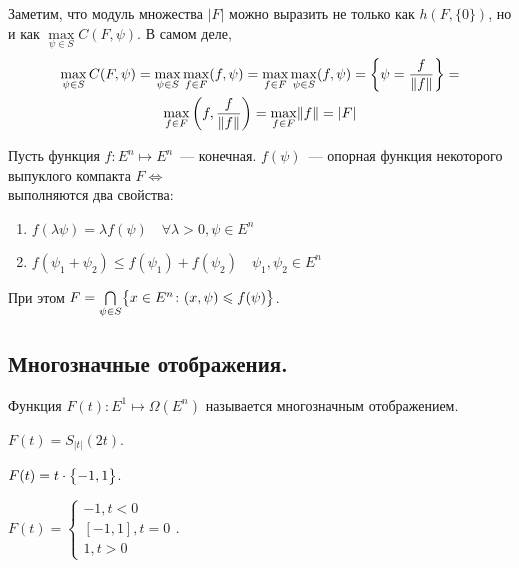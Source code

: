 Заметим, что модуль множества $|F|$ можно выразить не только как $h(F, \{0\})$, но и как $\max\limits_{\psi \in S} C(F, \psi)$.
В самом деле, 
\begin{multline*}
    \max\limits_{\psi \in S} C(F, \psi) = 
    \max\limits_{\psi \in S} \max\limits_{f \in F} (f, \psi) = 
    \max\limits_{f \in F} \max\limits_{\psi \in S} (f, \psi) = 
    \biggl\{ \psi = \frac{f}{\lVert f \rVert} \biggr\} = \\
    \max\limits_{f \in F} \left(f, \frac{f}{\lVert f \rVert}\right) =
    \max\limits_{f \in F} \lVert f \rVert = |F|
\end{multline*}

\begin{thm*}
    Пусть функция $f\colon E^n \mapsto E^n$~--- конечная.
    $f(\psi)$~--- опорная функция некоторого выпуклого компакта $F \iff$ \\
    выполняются два свойства:
    \begin{enumerate}
        \item $f(\lambda \psi) = \lambda f(\psi) \quad \forall \lambda > 0, \psi \in E^n$
        \item $f(\psi_1 + \psi_2) \leqslant f(\psi_1) + f(\psi_2) \quad \psi_1, \psi_2 \in E^n$
    \end{enumerate}

    При этом $F = \bigcap\limits_{\psi \in S} \bigl\{ x \in E^n\colon (x, \psi) \leqslant f(\psi) \bigr\}$.
\end{thm*}

\subsection*{Многозначные отображения.}

\begin{defn}
    Функция $F(t)\colon E^1 \mapsto \Omega(E^n)$ называется многозначным отображением.
\end{defn}

\begin{exmp}
    $F(t) = S_{|t|}(2t)$.
\end{exmp}

\begin{exmp}
    $F(t) = t \cdot \bigl\{ -1, 1 \bigr\}$.
\end{exmp}

\begin{exmp}
    $F(t) = \begin{cases}
        -1, t < 0 \\
        [-1, 1], t = 0 \\
        1, t > 0
    \end{cases}$.
\end{exmp}

